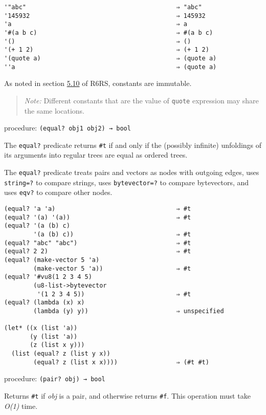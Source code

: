 \begin{verbatim}
'"abc"                                         ⇒ "abc"
'145932                                        ⇒ 145932
'a                                             ⇒ a
'#(a b c)                                      ⇒ #(a b c)
'()                                            ⇒ ()
'(+ 1 2)                                       ⇒ (+ 1 2)
'(quote a)                                     ⇒ (quote a)
''a                                            ⇒ (quote a)
\end{verbatim}

As noted in section
\href{http://www.r6rs.org/final/html/r6rs/r6rs-Z-H-8.html\#node_sec_5.10}{5.10}
of R6RS, constants are immutable.

\begin{quote}
\emph{Note:} Different constants that are the value of \texttt{quote}
expression may share the same locations.
\end{quote}

procedure: \texttt{(equal?\ obj1\ obj2)\ →\ bool}

The \texttt{equal?} predicate returns \texttt{\#t} if and only if the
(possibly infinite) unfoldings of its arguments into regular trees are
equal as ordered trees.

The \texttt{equal?} predicate treats pairs and vectors as nodes with
outgoing edges, uses \texttt{string=?} to compare strings, uses
\texttt{bytevector=?} to compare bytevectors, and uses \texttt{eqv?} to
compare other nodes.

\begin{verbatim}
(equal? 'a 'a)                                 ⇒ #t
(equal? '(a) '(a))                             ⇒ #t
(equal? '(a (b) c)
        '(a (b) c))                            ⇒ #t
(equal? "abc" "abc")                           ⇒ #t
(equal? 2 2)                                   ⇒ #t
(equal? (make-vector 5 'a)
        (make-vector 5 'a))                    ⇒ #t
(equal? '#vu8(1 2 3 4 5)
        (u8-list->bytevector
         '(1 2 3 4 5))                         ⇒ #t
(equal? (lambda (x) x)
        (lambda (y) y))                        ⇒ unspecified

(let* ((x (list 'a))
       (y (list 'a))
       (z (list x y)))
  (list (equal? z (list y x))
        (equal? z (list x x))))                ⇒ (#t #t)
\end{verbatim}

procedure: \texttt{(pair?\ obj)\ →\ bool}

Returns \texttt{\#t} if \emph{obj} is a pair, and otherwise returns
\texttt{\#f}. This operation must take \emph{O(1)} time.

